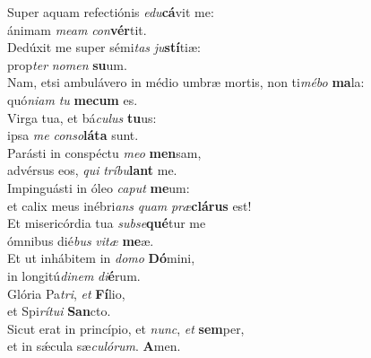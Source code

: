 \evenverse Super aquam refectiónis \textit{e}\textit{du}\textbf{cá}vit me:~\*\\
\evenverse ánimam \textit{me}\textit{am} \textit{con}\textbf{vér}tit.\\
\oddverse Dedúxit me super sémi\textit{tas} \textit{ju}\textbf{stí}tiæ:~\*\\
\oddverse prop\textit{ter} \textit{no}\textit{men} \textbf{su}um.\\
\evenverse Nam, etsi ambulávero in médio umbræ mortis, non ti\textit{mé}\textit{bo} \textbf{ma}la:~\*\\
\evenverse quó\textit{ni}\textit{am} \textit{tu} \textbf{me}\textbf{cum} es.\\
\oddverse Virga tua, et bá\textit{cu}\textit{lus} \textbf{tu}us:~\*\\
\oddverse ipsa \textit{me} \textit{con}\textit{so}\textbf{lá}\textbf{ta} sunt.\\
\evenverse Parásti in conspéctu \textit{me}\textit{o} \textbf{men}sam,~\*\\
\evenverse advérsus eos, \textit{qui} \textit{trí}\textit{bu}\textbf{lant} me.\\
\oddverse Impinguásti in óleo \textit{ca}\textit{put} \textbf{me}um:~\*\\
\oddverse et calix meus inébri\textit{ans} \textit{quam} \textit{præ}\textbf{clá}\textbf{rus} est!\\
\evenverse Et misericórdia tua \textit{sub}\textit{se}\textbf{qué}tur me~\*\\
\evenverse ómnibus dié\textit{bus} \textit{vi}\textit{tæ} \textbf{me}æ.\\
\oddverse Et ut inhábitem in \textit{do}\textit{mo} \textbf{Dó}mini,~\*\\
\oddverse in longitú\textit{di}\textit{nem} \textit{di}\textbf{é}rum.\\
\evenverse Glória Pa\textit{tri}, \textit{et} \textbf{Fí}lio,~\*\\
\evenverse et Spi\textit{rí}\textit{tu}\textit{i} \textbf{San}cto.\\
\oddverse Sicut erat in princípio, et \textit{nunc}, \textit{et} \textbf{sem}per,~\*\\
\oddverse et in sǽcula sæ\textit{cu}\textit{ló}\textit{rum}. \textbf{A}men.\\
